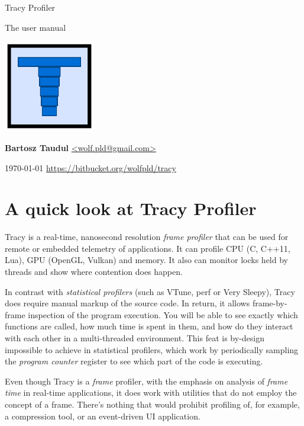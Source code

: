 \documentclass[hidelinks,titlepage,a4paper]{article}
\begin{document}
\begin{titlepage}
\centering
{\fontsize{120}{140}\selectfont Tracy Profiler}

\vspace{50pt} {\Huge{}\selectfont The user manual}

\vfill \includegraphics[height=40mm]{../icon/icon}

\vfill
\large\textbf{Bartosz Taudul} \href{mailto:wolf.pld@gmail.com}{<wolf.pld@gmail.com>}

\vspace{10pt}
\today
\vfill
\url{https://bitbucket.org/wolfpld/tracy}
\end{titlepage}

\tableofcontents

\newpage

\section{A quick look at Tracy Profiler}

Tracy is a real-time, nanosecond resolution \emph{frame profiler} that can be used for remote or embedded telemetry of applications. It can profile CPU (C, C++11, Lua), GPU (OpenGL, Vulkan) and memory. It also can monitor locks held by threads and show where contention does happen.

In contrast with \emph{statistical profilers} (such as VTune, perf or Very Sleepy), Tracy does require manual markup of the source code. In return, it allows frame-by-frame inspection of the program execution. You will be able to see exactly which functions are called, how much time is spent in them, and how do they interact with each other in a multi-threaded environment. This feat is by-design impossible to achieve in statistical profilers, which work by periodically sampling the \emph{program counter} register to see which part of the code is executing.

Even though Tracy is a \emph{frame} profiler, with the emphasis on analysis of \emph{frame time} in real-time applications, it does work with utilities that do not employ the concept of a frame. There's nothing that would prohibit profiling of, for example, a compression tool, or an event-driven UI application.
\end{document}
